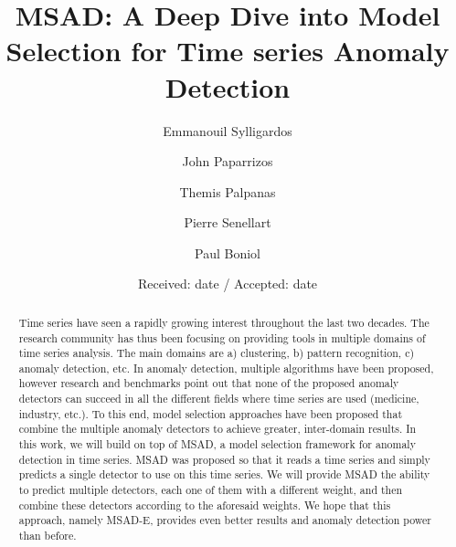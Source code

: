 \title{MSAD: A Deep Dive into Model Selection for Time series Anomaly Detection
}


\author{
Emmanouil Sylligardos \and
John Paparrizos \and
Themis Palpanas \and
Pierre Senellart \and
Paul Boniol
}



\date{Received: date / Accepted: date}


\maketitle

\begin{abstract}
Time series have seen a rapidly growing interest throughout the last two decades. The research community has thus been focusing on providing tools in multiple domains of time series analysis. The main domains are a) clustering, b) pattern recognition, c) anomaly detection, etc. In anomaly detection, multiple algorithms have been proposed, however research and benchmarks point out that none of the proposed anomaly detectors can succeed in all the different fields where time series are used (medicine, industry, etc.). To this end, model selection approaches have been proposed that combine the multiple anomaly detectors to achieve greater, inter-domain results. In this work, we will build on top of MSAD, a model selection framework for anomaly detection in time series. MSAD was proposed so that it reads a time series and simply predicts a single detector to use on this time series. We will provide MSAD the ability to predict multiple detectors, each one of them with a different weight, and then combine these detectors according to the aforesaid weights. We hope that this approach, namely MSAD-E, provides even better results and anomaly detection power than before.
\end{abstract}


